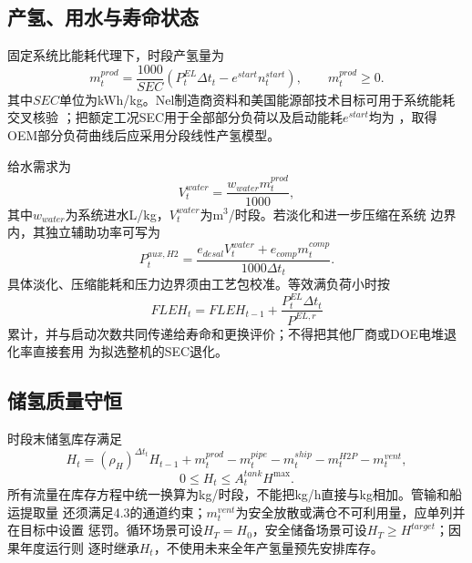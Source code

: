 \subsection{产氢、用水与寿命状态}

固定系统比能耗代理下，时段产氢量为
\begin{equation}
m_t^{prod}=\frac{1000}{SEC}
\left(P_t^{EL}\Delta t_t-e^{start}n_t^{start}\right),
\qquad m_t^{prod}\ge0.
\label{eq:h2-production}
\end{equation}
其中$SEC$单位为kWh/kg。Nel制造商资料和美国能源部技术目标可用于系统能耗交叉核验
\cite{nel-mc,doe-pem}；把额定工况SEC用于全部部分负荷以及启动能耗$e^{start}$均为
\assumptiontag，取得OEM部分负荷曲线后应采用分段线性产氢模型。

给水需求为
\begin{equation}
V_t^{water}=\frac{w_{water}m_t^{prod}}{1000},
\label{eq:h2-water}
\end{equation}
其中$w_{water}$为系统进水L/kg，$V_t^{water}$为m$^3$/时段。若淡化和进一步压缩在系统
边界内，其独立辅助功率可写为
\begin{equation}
P_t^{aux,H2}=
\frac{e_{desal}V_t^{water}+e_{comp}m_t^{comp}}
{1000\Delta t_t}.
\label{eq:h2-aux}
\end{equation}
具体淡化、压缩能耗和压力边界须由工艺包校准。等效满负荷小时按
\begin{equation}
FLEH_t=FLEH_{t-1}+\frac{P_t^{EL}\Delta t_t}{P^{EL,r}}
\label{eq:h2-fleh}
\end{equation}
累计，并与启动次数共同传递给寿命和更换评价；不得把其他厂商或DOE电堆退化率直接套用
为拟选整机的SEC退化。

\subsection{储氢质量守恒}

时段末储氢库存满足
\begin{equation}
H_t=(\rho_H)^{\Delta t_t}H_{t-1}+m_t^{prod}
-m_t^{pipe}-m_t^{ship}-m_t^{H2P}-m_t^{vent},
\label{eq:h2-inventory}
\end{equation}
\begin{equation}
0\le H_t\le A_t^{tank}H^{\max}.
\label{eq:h2-capacity}
\end{equation}
所有流量在库存方程中统一换算为kg/时段，不能把kg/h直接与kg相加。管输和船运提取量
还须满足4.3的通道约束；$m_t^{vent}$为安全放散或满仓不可利用量，应单列并在目标中设置
惩罚。循环场景可设$H_T=H_0$，安全储备场景可设$H_T\ge H^{target}$；因果年度运行则
逐时继承$H_t$，不使用未来全年产氢量预先安排库存。

